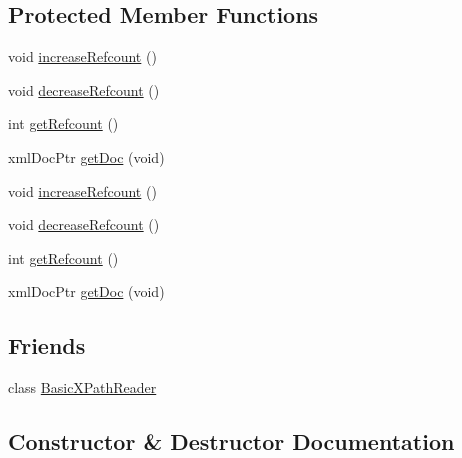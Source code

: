 \subsection*{Protected Member Functions}
\begin{DoxyCompactItemize}
\item 
void \mbox{\hyperlink{classXMLXPathReader_1_1XMLDocument_ac39670aea17809a726dc6a2cc91c9710}{increase\+Refcount}} ()
\item 
void \mbox{\hyperlink{classXMLXPathReader_1_1XMLDocument_af1e14d662e9ebf8ce5288d5c77ca4ac6}{decrease\+Refcount}} ()
\item 
int \mbox{\hyperlink{classXMLXPathReader_1_1XMLDocument_af2b6cf36ebceab808e4856d3e7a20921}{get\+Refcount}} ()
\item 
xml\+Doc\+Ptr \mbox{\hyperlink{classXMLXPathReader_1_1XMLDocument_aa4fceaafd3c764004b6da33a26acc16d}{get\+Doc}} (void)
\item 
void \mbox{\hyperlink{classXMLXPathReader_1_1XMLDocument_ac39670aea17809a726dc6a2cc91c9710}{increase\+Refcount}} ()
\item 
void \mbox{\hyperlink{classXMLXPathReader_1_1XMLDocument_af1e14d662e9ebf8ce5288d5c77ca4ac6}{decrease\+Refcount}} ()
\item 
int \mbox{\hyperlink{classXMLXPathReader_1_1XMLDocument_af2b6cf36ebceab808e4856d3e7a20921}{get\+Refcount}} ()
\item 
xml\+Doc\+Ptr \mbox{\hyperlink{classXMLXPathReader_1_1XMLDocument_aa4fceaafd3c764004b6da33a26acc16d}{get\+Doc}} (void)
\end{DoxyCompactItemize}
\subsection*{Friends}
\begin{DoxyCompactItemize}
\item 
class \mbox{\hyperlink{classXMLXPathReader_1_1XMLDocument_aab456070fa37ace014ac68d8cfd00c68}{Basic\+X\+Path\+Reader}}
\end{DoxyCompactItemize}


\subsection{Constructor \& Destructor Documentation}
\mbox{\label{classXMLXPathReader_1_1XMLDocument_aa7385c1ff92fb49af6fee17de7e6a7d3}} 
